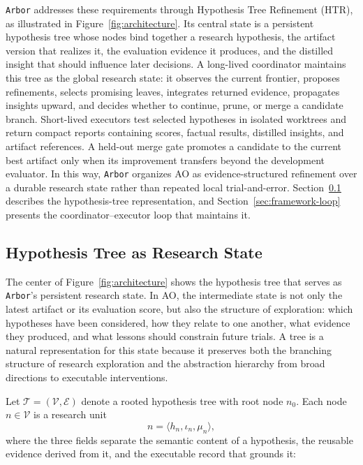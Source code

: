 \documentclass[]{selfevolagent}
\theoremstyle{plain}
\theoremstyle{definition}
\theoremstyle{remark}
\newcommand{\arbor}{\texttt{Arbor}}
\begin{document}
\arbor{} addresses these requirements through Hypothesis Tree Refinement (HTR), as illustrated in Figure~\ref{fig:architecture}. Its central state is a persistent hypothesis tree whose nodes bind together a research hypothesis, the artifact version that realizes it, the evaluation evidence it produces, and the distilled insight that should influence later decisions. A long-lived coordinator maintains this tree as the global research state: it observes the current frontier, proposes refinements, selects promising leaves, integrates returned evidence, propagates insights upward, and decides whether to continue, prune, or merge a candidate branch. Short-lived executors test selected hypotheses in isolated worktrees and return compact reports containing scores, factual results, distilled insights, and artifact references. A held-out merge gate promotes a candidate to the current best artifact only when its improvement transfers beyond the development evaluator. In this way, \arbor{} organizes AO as evidence-structured refinement over a durable research state rather than repeated local trial-and-error. Section~\ref{sec:framework-htr} describes the hypothesis-tree representation, and Section~\ref{sec:framework-loop} presents the coordinator--executor loop that maintains it.

\subsection{Hypothesis Tree as Research State}
\label{sec:framework-htr}
The center of Figure~\ref{fig:architecture} shows the hypothesis tree that serves as \arbor{}'s persistent research state. In AO, the intermediate state is not only the latest artifact or its evaluation score, but also the structure of exploration: which hypotheses have been considered, how they relate to one another, what evidence they produced, and what lessons should constrain future trials. A tree is a natural representation for this state because it preserves both the branching structure of research exploration and the abstraction hierarchy from broad directions to executable interventions.

Let $\mathcal{T}=(\mathcal{V}, \mathcal{E})$ denote a rooted hypothesis tree with root node $n_0$. Each node $n\in\mathcal{V}$ is a research unit
\[
n = \langle h_n, \iota_n, \mu_n \rangle,
\]
where the three fields separate the semantic content of a hypothesis, the reusable evidence derived from it, and the executable record that grounds it:
\end{document}
